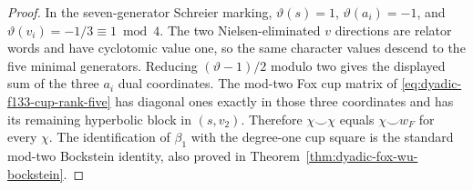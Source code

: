 \begin{proof}
In the
seven-generator
Schreier marking,
$\vartheta(s)=1$,
$\vartheta(a_i)=-1$,
and
$\vartheta(v_i)=-1/3
\equiv1\bmod4$.
The two
Nielsen-eliminated
$v$ directions
are relator
words and have
cyclotomic value
one, so the
same character
values descend
to the five
minimal generators.
Reducing
$(\vartheta-1)/2$
modulo two gives
the displayed
sum of the
three $a_i$
dual coordinates.
The mod-two
Fox cup matrix
of
\eqref{eq:dyadic-f133-cup-rank-five}
has diagonal
ones exactly
in those
three coordinates
and has its
remaining
hyperbolic block
in $(s,v_2)$.
Therefore
$\chi\smile\chi$
equals
$\chi\smile w_F$
for every $\chi$.
The identification
of $\beta_1$
with the
degree-one cup
square is
the standard
mod-two
Bockstein identity,
also proved in
Theorem~\ref{thm:dyadic-fox-wu-bockstein}.
\end{proof}

